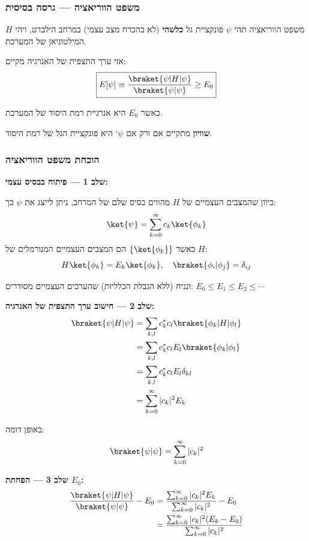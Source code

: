 \subsubsection*{משפט הווריאציה — גרסה בסיסית}

\begin{theorembox}{משפט הווריאציה}
תהי $\psi$ פונקציית גל \textbf{כלשהי} (לא בהכרח מצב עצמי) במרחב הילברט, ויהי $H$ המילטוניאן של המערכת. 

אזי ערך התצפית של האנרגיה מקיים:
\[
\boxed{E[\psi] \equiv \frac{\braket{\psi|H|\psi}}{\braket{\psi|\psi}} \geq E_0}
\]

כאשר $E_0$ היא אנרגיית רמת היסוד של המערכת.

\textbf{שוויון} מתקיים אם ורק אם $\psi$` היא פונקציית הגל של רמת היסוד.
\end{theorembox}

\subsubsection*{הוכחת משפט הווריאציה}

\textbf{שלב 1 — פיתוח בבסיס עצמי:}

כיוון שהמצבים העצמיים של $H$ מהווים בסיס שלם של המרחב, ניתן לייצג את $\psi$ כך:
\[
\ket{\psi} = \sum_{k=0}^{\infty} c_k \ket{\phi_k}
\]
כאשר $\{\ket{\phi_k}\}$ הם המצבים העצמיים המנורמלים של $H$:
\[
H\ket{\phi_k} = E_k\ket{\phi_k}, \quad \braket{\phi_i|\phi_j} = \delta_{ij}
\]

ונניח (ללא הגבלת הכלליות) שהערכים העצמיים מסודרים: $E_0 \leq E_1 \leq E_2 \leq \cdots$

\textbf{שלב 2 — חישוב ערך התצפית של האנרגיה:}
\begin{align*}
\braket{\psi|H|\psi} &= \sum_{k,l} c_k^* c_l \braket{\phi_k|H|\phi_l} \\
&= \sum_{k,l} c_k^* c_l E_l \braket{\phi_k|\phi_l} \\
&= \sum_{k,l} c_k^* c_l E_l \delta_{kl} \\
&= \sum_{k=0}^{\infty} |c_k|^2 E_k
\end{align*}

באופן דומה:
\[
\braket{\psi|\psi} = \sum_{k=0}^{\infty} |c_k|^2
\]

\textbf{שלב 3 — הפחתת $E_0$:}
\begin{align*}
\frac{\braket{\psi|H|\psi}}{\braket{\psi|\psi}} - E_0 &= \frac{\sum_{k=0}^{\infty} |c_k|^2 E_k}{\sum_{k=0}^{\infty} |c_k|^2} - E_0 \\
&= \frac{\sum_{k=0}^{\infty} |c_k|^2 (E_k - E_0)}{\sum_{k=0}^{\infty} |c_k|^2}
\end{align*}


